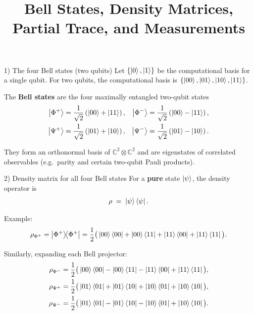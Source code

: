 \documentclass[aspectratio=169]{beamer}
\title{Bell States, Density Matrices, Partial Trace, and Measurements}
\author{}
\institute{}
\date{}
\begin{document}
\begin{frame}
  \titlepage
\end{frame}

\begin{frame}{1) The four Bell states (two qubits)}
Let $\{\ket{0},\ket{1}\}$ be the computational basis for a single qubit.
For two qubits, the computational basis is
$\{\ket{00},\ket{01},\ket{10},\ket{11}\}$.

\medskip
The \textbf{Bell states} are the four maximally entangled two-qubit states
\begin{align}
\ket{\Phi^{+}} &= \frac{1}{\sqrt{2}}\left(\ket{00}+\ket{11}\right), &
\ket{\Phi^{-}} &= \frac{1}{\sqrt{2}}\left(\ket{00}-\ket{11}\right),\\
\ket{\Psi^{+}} &= \frac{1}{\sqrt{2}}\left(\ket{01}+\ket{10}\right), &
\ket{\Psi^{-}} &= \frac{1}{\sqrt{2}}\left(\ket{01}-\ket{10}\right).
\end{align}

\medskip
They form an orthonormal basis of $\mathbb{C}^2\otimes\mathbb{C}^2$ and are
eigenstates of correlated observables (e.g.\ parity and certain two-qubit Pauli products).
\end{frame}

\begin{frame}{2) Density matrix for all four Bell states}
For a \textbf{pure} state $\ket{\psi}$, the density operator is
\[
\rho \;=\; \ket{\psi}\bra{\psi}.
\]

\medskip
Example:
\[
\rho_{\Phi^{+}}=\dyad{\Phi^{+}}
=\frac{1}{2}\big(\ket{00}\bra{00}+\ket{00}\bra{11}+\ket{11}\bra{00}+\ket{11}\bra{11}\big).
\]

\medskip
Similarly, expanding each Bell projector:
\begin{align}
\rho_{\Phi^{-}} &= \frac{1}{2}\big(\ket{00}\bra{00}-\ket{00}\bra{11}-\ket{11}\bra{00}+\ket{11}\bra{11}\big),\\
\rho_{\Psi^{+}} &= \frac{1}{2}\big(\ket{01}\bra{01}+\ket{01}\bra{10}+\ket{10}\bra{01}+\ket{10}\bra{10}\big),\\
\rho_{\Psi^{-}} &= \frac{1}{2}\big(\ket{01}\bra{01}-\ket{01}\bra{10}-\ket{10}\bra{01}+\ket{10}\bra{10}\big).
\end{align}
\end{frame}
\end{document}
